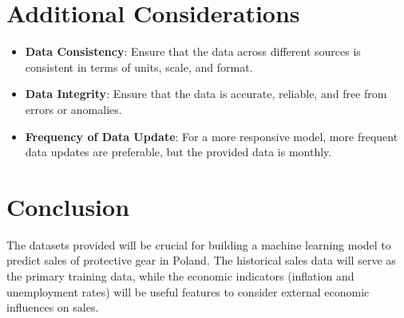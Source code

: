 \documentclass{article}
\begin{document}
\section{Additional Considerations}
\begin{itemize}
    \item \textbf{Data Consistency}: Ensure that the data across different sources is consistent in terms of units, scale, and format.
    \item \textbf{Data Integrity}: Ensure that the data is accurate, reliable, and free from errors or anomalies.
    \item \textbf{Frequency of Data Update}: For a more responsive model, more frequent data updates are preferable, but the provided data is monthly.
\end{itemize}

\section{Conclusion}
The datasets provided will be crucial for building a machine learning model to predict sales of protective gear in Poland. The historical sales data will serve as the primary training data, while the economic indicators (inflation and unemployment rates) will be useful features to consider external economic influences on sales.
\end{document}
